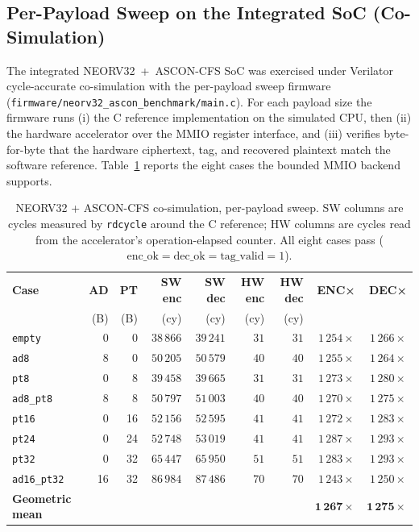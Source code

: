 \documentclass[11pt,a4paper]{article}
\begin{document}
\subsection{Per-Payload Sweep on the Integrated SoC (Co-Simulation)}
\label{sec:sweep}

The integrated NEORV32~+~ASCON-CFS SoC was exercised under Verilator
cycle-accurate co-simulation with the per-payload sweep firmware
(\texttt{firmware/neorv32\_ascon\_benchmark/main.c}). For each
payload size the firmware runs (i) the C reference implementation on
the simulated CPU, then (ii) the hardware accelerator over the MMIO
register interface, and (iii) verifies byte-for-byte that the
hardware ciphertext, tag, and recovered plaintext match the software
reference. Table~\ref{tab:sweep} reports the eight cases the bounded
MMIO backend supports.

\begin{table}[H]
\centering
\caption{NEORV32 + ASCON-CFS co-simulation, per-payload sweep.
SW columns are cycles measured by \texttt{rdcycle} around the C
reference; HW columns are cycles read from the accelerator's
operation-elapsed counter. All eight cases pass
($\text{enc\_ok}=\text{dec\_ok}=\text{tag\_valid}=1$).}
\label{tab:sweep}
\small
\begin{tabular}{lrrrrrrrr}
\toprule
\rowcolor{tabhead!20}
\textbf{Case} & \textbf{AD} & \textbf{PT} &
\textbf{SW enc} & \textbf{SW dec} &
\textbf{HW enc} & \textbf{HW dec} &
\textbf{ENC×} & \textbf{DEC×}\\
              & (B) & (B) & (cy) & (cy) & (cy) & (cy) & & \\
\midrule
\texttt{empty}      &  0 &  0 & $38\,866$ & $39\,241$ & $31$ & $31$ & $1\,254\times$ & $1\,266\times$\\
\texttt{ad8}        &  8 &  0 & $50\,205$ & $50\,579$ & $40$ & $40$ & $1\,255\times$ & $1\,264\times$\\
\texttt{pt8}        &  0 &  8 & $39\,458$ & $39\,665$ & $31$ & $31$ & $1\,273\times$ & $1\,280\times$\\
\texttt{ad8\_pt8}   &  8 &  8 & $50\,797$ & $51\,003$ & $40$ & $40$ & $1\,270\times$ & $1\,275\times$\\
\texttt{pt16}       &  0 & 16 & $52\,156$ & $52\,595$ & $41$ & $41$ & $1\,272\times$ & $1\,283\times$\\
\texttt{pt24}       &  0 & 24 & $52\,748$ & $53\,019$ & $41$ & $41$ & $1\,287\times$ & $1\,293\times$\\
\texttt{pt32}       &  0 & 32 & $65\,447$ & $65\,950$ & $51$ & $51$ & $1\,283\times$ & $1\,293\times$\\
\texttt{ad16\_pt32} & 16 & 32 & $86\,984$ & $87\,486$ & $70$ & $70$ & $1\,243\times$ & $1\,250\times$\\
\midrule
\textbf{Geometric mean} & & & & & & & $\mathbf{1\,267\times}$ & $\mathbf{1\,275\times}$\\
\bottomrule
\end{tabular}
\end{table}
\end{document}
